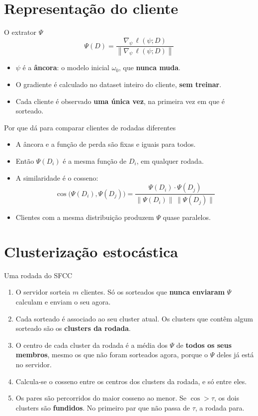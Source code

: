 \documentclass[aspectratio=169]{beamer}
\begin{document}
\section{Representação do cliente}

\begin{frame}{O extrator $\Psi$}
  \[
    \Psi(D) = \frac{\nabla_{\psi}\,\ell(\psi; D)}{\left\|\nabla_{\psi}\,\ell(\psi; D)\right\|}
  \]
  \begin{itemize}
    \item $\psi$ é a \textbf{âncora}: o modelo inicial $\omega_0$, que \textbf{nunca muda}.
    \item O gradiente é calculado no dataset inteiro do cliente, \textbf{sem treinar}.
    \item Cada cliente é observado \textbf{uma única vez}, na primeira vez em que é sorteado.
  \end{itemize}
\end{frame}

\begin{frame}{Por que dá para comparar clientes de rodadas diferentes}
  \begin{itemize}
    \item A âncora e a função de perda são fixas e iguais para todos.
    \item Então $\Psi(D_i)$ é a mesma função de $D_i$, em qualquer rodada.
    \item A similaridade é o cosseno:
      \[
        \cos\big(\Psi(D_i), \Psi(D_j)\big) = \frac{\Psi(D_i)\cdot\Psi(D_j)}{\|\Psi(D_i)\|\,\|\Psi(D_j)\|}
      \]
    \item Clientes com a mesma distribuição produzem $\Psi$ quase paralelos.
  \end{itemize}
\end{frame}

\section{Clusterização estocástica}

\begin{frame}{Uma rodada do SFCC}
  \begin{enumerate}
    \item O servidor sorteia $m$ clientes. Só os sorteados que \textbf{nunca enviaram}
      $\Psi$ calculam e enviam o seu agora.
    \item Cada sorteado é associado ao seu cluster atual. Os clusters que contêm algum sorteado
      são os \textbf{clusters da rodada}.
    \item O centro de cada cluster da rodada é a média dos $\Psi$ de \textbf{todos os seus
      membros}, mesmo os que não foram sorteados agora, porque o $\Psi$ deles já está no servidor.
    \item Calcula-se o cosseno entre os centros dos clusters da rodada, e só entre eles.
    \item Os pares são percorridos do maior cosseno ao menor. Se $\cos > \tau$, os dois clusters
      são \textbf{fundidos}. No primeiro par que não passa de $\tau$, a rodada para.
  \end{enumerate}
\end{frame}
\end{document}
